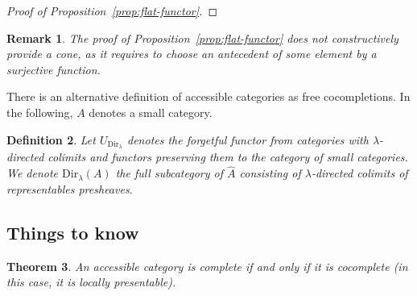\documentclass{article}
\newcommand{\Dir}[1]{\text{Dir}_{#1}}
\newtheorem{theorem}{Theorem}[section]
\newtheorem{definition}[theorem]{Definition}
\newtheorem{remark}[theorem]{Remark}
\begin{document}
\begin{proof}[Proof of Proposition~\ref{prop:flat-functor}]


\end{proof}
\begin{remark}
 The 
 proof of Proposition~\ref{prop:flat-functor}
 does not constructively provide a cone, as it requires to choose an
 antecedent of some element by a surjective function.
\end{remark}

There is an alternative definition of accessible categories as free cocompletions.
In the following, $A$ denotes a small category.
\begin{definition}
  Let $U_{\Dir\lambda}$ denotes the forgetful functor from 
  categories with $\lambda$-directed colimits and functors preserving them to
  the category of small categories.
  We denote $\Dir\lambda(A)$ the full subcategory of $\hat{A}$ consisting of
  $\lambda$-directed colimits of representables presheaves.
\end{definition}
\subsection{Things to know}
\begin{theorem}
	\cite[2.47]{adamek_rosicky}
	An accessible category is complete if and only if it is cocomplete (in this case, it is locally presentable).
\end{theorem}
\end{document}

